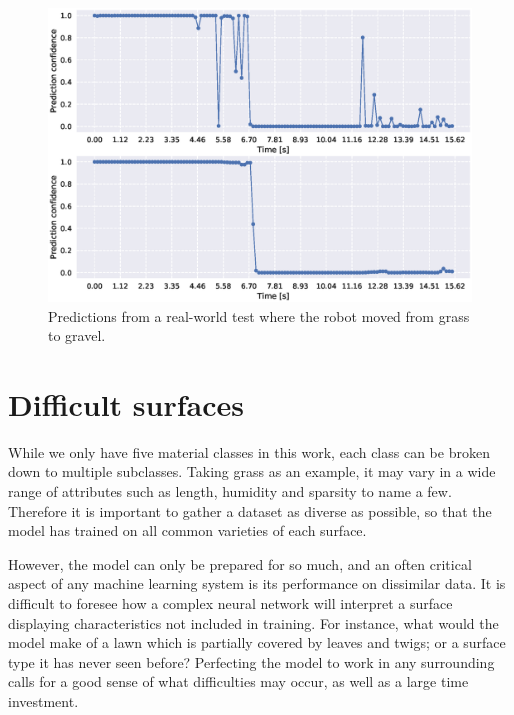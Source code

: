 \begin{figure}
	\centering
	\includegraphics[scale=0.5]{figs_temp/transition_grass_gravel2}
	\caption{Predictions from a real-world test where the robot moved from grass to gravel.}
	\label{fig:trans_gg}
\end{figure}

\section{Difficult surfaces}
While we only have five material classes in this work, each class can be broken down to multiple subclasses. Taking grass as an example, it may vary in a wide range of attributes such as length, humidity and sparsity to name a few. Therefore it is important to gather a dataset as diverse as possible, so that the model has trained on all common varieties of each surface. 

However, the model can only be prepared for so much, and an often critical aspect of any machine learning system is its performance on dissimilar data. It is difficult to foresee how a complex neural network will interpret a surface displaying characteristics not included in training. For instance, what would the model make of a lawn which is partially covered by leaves and twigs; or a surface type it has never seen before? Perfecting the model to work in any surrounding calls for a good sense of what difficulties may occur, as well as a large time investment. 


